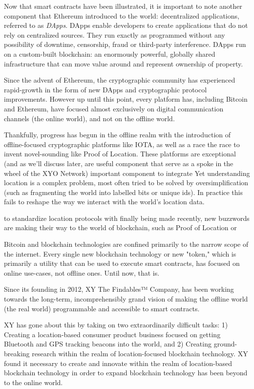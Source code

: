 \documentclass{article}
\begin{document}
Now that smart contracts have been illustrated, it is important to note another component that Ethereum introduced to the world: decentralized applications, referred to as \textit{DApps}. DApps enable developers to create applications that do not rely on centralized sources. They run exactly as programmed without any possibility of downtime, censorship, fraud or third-party interference. DApps run on a custom-built blockchain: an enormously powerful, globally shared infrastructure that can move value around and represent ownership of property.

Since the advent of Ethereum, the cryptographic community has experienced rapid-growth in the form of new DApps and  cryptographic protocol improvements. However up until this point, every platform has, including Bitcoin and Ethereum, have focused almost exclusively on digital communication channels (the online world), and not on the offline world.

Thankfully, progress has begun in the offline realm with the introduction of offline-focused cryptographic platforms like IOTA, as well as a race the race to invent novel-sounding like Proof of Location. These platforms are exceptional (and as we'll discuss later, are useful component that serve as a spoke in the wheel of the XYO Network) important component to integrate Yet understanding location is a complex problem, most often tried to be solved by oversimplification (such as fragmenting the world into labelled bits or unique ids). In practice this fails to reshape the way we interact with the world's location data. 

 to standardize location protocols with finally being made  recently, new buzzwords are making their way to the world of blockchain, such as Proof of Location or 

Bitcoin and blockchain technologies are confined primarily to the narrow scope of the internet. Every single new blockchain technology or new "token," which is primarily a utility that can be used to execute smart contracts, has focused on online use-cases, not offline ones. Until now, that is.

Since its founding in 2012, XY The Findables™ Company, has been working towards the long-term, incomprehensibly grand vision of making the offline world (the real world) programmable and accessible to smart contracts. 

XY has gone about this by taking on two extraordinarily difficult tasks: 1) Creating a location-based consumer product business focused on getting Bluetooth and GPS tracking beacons into the world, and 2) Creating ground-breaking research within the realm of location-focused blockchain technology. XY found it necessary to create and innovate within the realm of location-based blockchain technology in order to expand blockchain technology has been beyond to the online world.
\end{document}
